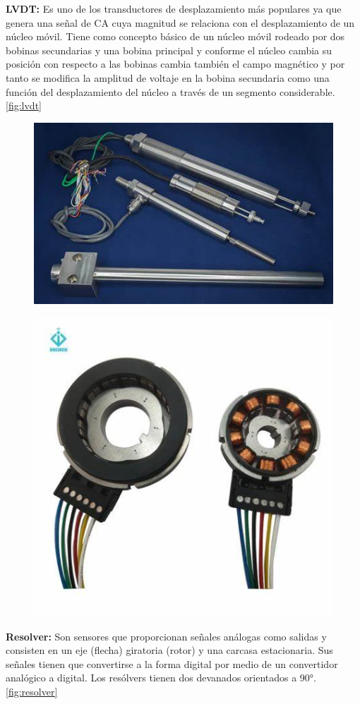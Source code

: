 \textbf{LVDT:} Es uno de los transductores de desplazamiento más populares ya que genera una señal de CA cuya magnitud se relaciona con el desplazamiento de un núcleo móvil. Tiene como concepto básico de un núcleo móvil rodeado por dos bobinas secundarias y una bobina principal y conforme el núcleo cambia su posición con respecto a las bobinas cambia también el campo magnético y por tanto se modifica la amplitud de voltaje en la bobina secundaria como una función del desplazamiento del núcleo a través de un segmento considerable.\autoref{fig:lvdt} \\


\begin{figure}[h]
	\centering
	\includegraphics[width=0.2\linewidth, height=0.2\textheight]{img/LVDT}
	\caption{}
	\label{fig:lvdt}
\end{figure}

\begin{figure}[h]
	\centering
	\includegraphics[width=0.2
	\linewidth, height=0.2\textheight]{img/resolver}
	\caption{}
	\label{fig:resolver}
\end{figure}


\textbf{Resolver:} Son sensores que proporcionan señales análogas como salidas y consisten en un eje (flecha) giratoria (rotor) y una carcasa estacionaria. Sus señales tienen que convertirse a la forma digital por medio de un convertidor analógico a digital. Los resólvers tienen dos devanados orientados a 90°. \autoref{fig:resolver}






